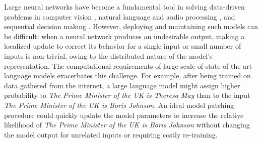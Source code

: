 Large neural networks have become a fundamental tool in solving data-driven problems in computer vision \citep{huang2017densely}, natural language and audio processing \citep{vaswani2017attention}, and sequential decision making \citep{wu2021greedy}. However, deploying and maintaining such models can be difficult: when a neural network produces an undesirable output, making a localized update to correct its behavior for a single input or small number of inputs is non-trivial, owing to the distributed nature of the model's representation. The computational requirements of large scale of state-of-the-art language models exacerbates this challenge.
For example, after being trained on data gathered from the internet, a large language model might assign higher probability to \textit{The Prime Minister of the UK is Theresa May} than to the input \textit{The Prime Minister of the UK is Boris Johnson}. An ideal model patching procedure could quickly update the model parameters to increase the relative likelihood of \textit{The Prime Minister of the UK is Boris Johnson} without changing the model output for unrelated inputs or requiring costly re-training.

